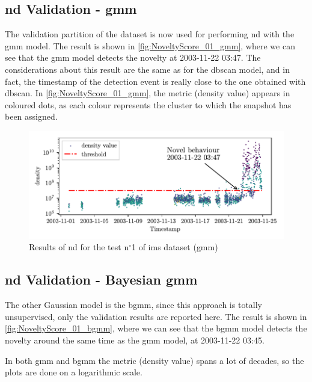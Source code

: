 \subsection{\gls{nd} Validation - \gls{gmm}}
The validation partition of the dataset is now used for performing \gls{nd} with the \gls{gmm} model. The result is shown in \autoref{fig:NoveltyScore_01_gmm}, where we can see that the \gls{gmm} model detects the novelty at 2003-11-22 03:47. The considerations about this result are the same as for the \gls{dbscan} model, and in fact, the timestamp of the detection event is really close to the one obtained with \gls{dbscan}. In \autoref{fig:NoveltyScore_01_gmm}, the metric (density value) appears in coloured dots, as each colour represents the cluster to which the snapshot has been assigned.
\begin{figure}
    \centering
    \includegraphics{images/IMS/Novelty_01_500samples_bearing3x_gmm.pdf}
    \caption{Results of \gls{nd} for the test $\text{n}^\circ$1 of \gls{ims} dataset (\gls{gmm})}
    \label{fig:NoveltyScore_01_gmm}
\end{figure}

\subsection{\gls{nd} Validation - Bayesian \gls{gmm}}
The other Gaussian model is the \gls{bgmm}, since this approach is totally unsupervised, only the validation results are reported here. The result is shown in \autoref{fig:NoveltyScore_01_bgmm}, where we can see that the \gls{bgmm} model detects the novelty around the same time as the \gls{gmm} model, at 2003-11-22 03:45.

In both \gls{gmm} and \gls{bgmm} the metric (density value) spans a lot of decades, so the plots are done on a logarithmic scale.

